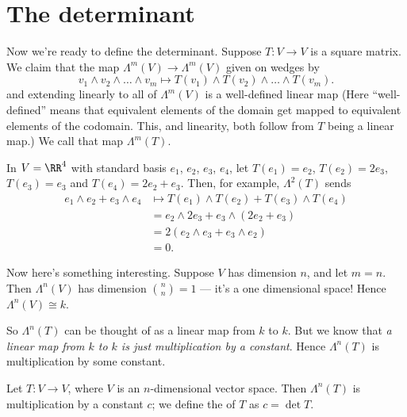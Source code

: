\section{The determinant}

Now we're ready to define the determinant.
Suppose $T \colon V \to V$ is a square matrix.
We claim that the map $\Lambda^m(V) \to \Lambda^m(V)$ given on wedges by
\[ v_1 \wedge v_2 \wedge \dots \wedge v_m
	\mapsto T(v_1) \wedge T(v_2) \wedge \dots \wedge T(v_m). \]
and extending linearly to all of $\Lambda^m(V)$ is a
well-defined  linear map
(Here ``well-defined'' means that equivalent elements of the domain
get mapped to equivalent elements of the codomain.
This, and linearity, both follow from $T$ being a linear map.)
We call that map $\Lambda^m(T)$.
\begin{example}
	In $V = \RR^4$ with standard basis $e_1$, $e_2$, $e_3$, $e_4$,
	let $T(e_1) = e_2$, $T(e_2) = 2e_3$, $T(e_3) = e_3$ and $T(e_4) = 2e_2 + e_3$.
	Then, for example, $\Lambda^2(T)$ sends
	\begin{align*}
		e_1 \wedge e_2 + e_3 \wedge e_4
		&\mapsto T(e_1) \wedge T(e_2) + T(e_3) \wedge T(e_4) \\
		&= e_2 \wedge 2e_3 + e_3 \wedge (2e_2 + e_3) \\
		&= 2(e_2 \wedge e_3 + e_3 \wedge e_2) \\
		&= 0.
	\end{align*}
\end{example}

Now here's something interesting.
Suppose $V$ has dimension $n$, and let $m=n$.
Then $\Lambda^n(V)$ has dimension $\binom nn = 1$ --- it's a one dimensional space!
Hence $\Lambda^n(V) \cong k$.

So $\Lambda^n(T)$ can be thought of as a linear map from $k$ to $k$.
But we know that \emph{a linear map from $k$ to $k$ is just multiplication by a constant}.
Hence $\Lambda^n(T)$ is multiplication by some constant.
\begin{definition}
	Let $T \colon V \to V$, where $V$ is an $n$-dimensional vector space.
	Then $\Lambda^n(T)$ is multiplication by a constant $c$;
	we define the  of $T$ as $c = \det T$.
\end{definition}

